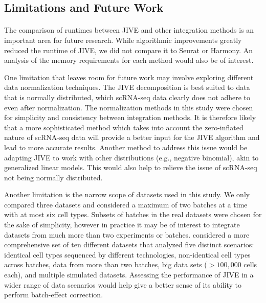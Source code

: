 \documentclass[
12pt, %
letterpaper, %
oneside, %
headinclude,footinclude, %
BCOR5mm, %
]{scrartcl}
\begin{document}
\subsection{Limitations and Future Work}

\paragraph*{}
The comparison of runtimes between JIVE and other integration methods is an important area for future research. While algorithmic improvements greatly reduced the runtime of JIVE, we did not compare it to Seurat or Harmony. An analysis of the memory requirements for each method would also be of interest.

One limitation that leaves room for future work may involve exploring different data normalization techniques. The JIVE decomposition is best suited to data that is normally distributed, which scRNA-seq data clearly does not adhere to even after normalization. The normalization methods in this study were chosen for simplicity and consistency between integration methods. It is therefore likely that a more sophisticated method which takes into account the zero-inflated nature of scRNA-seq data will provide a better input for the JIVE algorithm and lead to more accurate results. Another method to address this issue would be adapting JIVE to work with other distributions (e.g., negative binomial), akin to generalized linear models. This would also help to relieve the issue of scRNA-seq not being normally distributed.

Another limitation is the narrow scope of datasets used in this study. We only compared three datasets and considered a maximum of two batches at a time with at most six cell types. Subsets of batches in the real datasets were chosen for the sake of simplicity, however in practice it may be of interest to integrate datasets from much more than two experiments or batches. \citet{tran2020benchmark} considered a more comprehensive set of ten different datasets that analyzed five distinct scenarios: identical cell types sequenced by different technologies, non-identical cell types across batches, data from more than two batches, big data sets ($>100,000$ cells each), and multiple simulated datasets. Assessing the performance of JIVE in a wider range of data scenarios would help give a better sense of its ability to perform batch-effect correction.


\renewcommand{\refname}{\spacedlowsmallcaps{References}} %


% 

\end{document}
